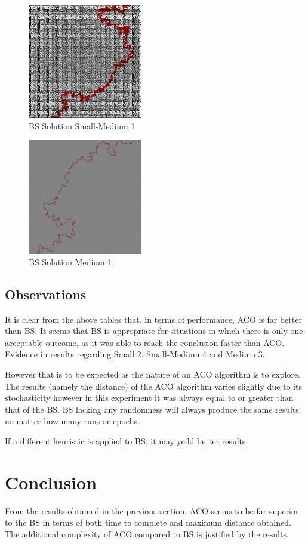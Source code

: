 \documentclass[conference]{IEEEtran}
\begin{document}
    \begin{figure}[h]
        \centering
        \includegraphics[width=5cm]{images/BS_SM1.png}
        \caption{BS Solution Small-Medium 1}
    \end{figure}
    \begin{figure}[h]
        \centering
        \includegraphics[width=5cm]{images/BS_M1.png}
        \caption{BS Solution Medium 1}
    \end{figure}
    \subsection{Observations}
        It is clear from the above tables that, in terms of performance, ACO is far better than BS. It seems that BS is appropriate for situations in which there is only one acceptable outcome, as it was able to reach the conclusion faster than ACO. Evidence in results regarding Small 2, Small-Medium 4 and Medium 3. 
        
        However that is to be expected as the nature of an ACO algorithm is to explore. The results (namely the distance) of the ACO algorithm varies slightly due to its stochasticity  however in this experiment it was always equal to or greater than that of the BS. BS lacking any randomness will always produce the same results no matter how many runs or epochs. 
        
        If a different heuristic is applied to BS, it may yeild better results. 
\section{Conclusion}
    From the results obtained in the previous section, ACO seems to be far superior to the BS in terms of both time to complete and maximum distance obtained. The additional complexity of ACO compared to BS is justified by the results.
    




\appendix
    
    
\end{document}
